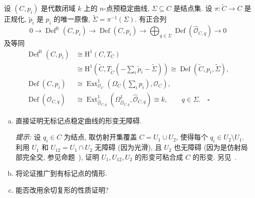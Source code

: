 \begin{proposition}[从局部到整体的形变序列]\label{src:6.3.28}
设 $(C,\allowbreak p_i)$ 是代数闭域 $k$ 上的 $n$-点预稳定曲线, $\Sigma\subseteq C$ 是结点集. 设 $\pi:\widetilde C\to\allowbreak C$ 是正规化, $\widetilde p_i$ 是 $p_i$ 的唯一原像, $\widetilde\Sigma=\pi^{-1}(\Sigma)$. 有正合列
\begin{equation}\label{src:6.3.29}
0\to\operatorname{Def}^{\mathrm{lt}}(C,p_i)\to\operatorname{Def}(C,p_i)\to\bigoplus_{q\in\Sigma}\operatorname{Def}(\widehat{\mathcal O}_{C,q})\to0
\end{equation}
及等同
\[
\begin{aligned}
\operatorname{Def}^{\mathrm{lt}}(C,p_i)&\cong\mathrm H^1(C,T_C)\\
&\cong\mathrm H^1(\widetilde C,T_{\widetilde C}(-\sum_i\widetilde p_i-\widetilde\Sigma))\cong\operatorname{Def}(\widetilde C,p_i,\widetilde\Sigma),\\
\operatorname{Def}(C,p_i)&\cong\operatorname{Ext}^1_{\mathcal O_C}(\Omega_C(\sum_i p_i),\mathcal O_C),\\
\operatorname{Def}(\widehat{\mathcal O}_{C,q})&\cong\operatorname{Ext}^1_{\widehat{\mathcal O}_{C,q}}(\Omega^1_{\widehat{\mathcal O}_{C,q}},\widehat{\mathcal O}_{C,q})\cong k,\qquad q\in\Sigma.\quad\square
\end{aligned}
\]
\end{proposition}
\begin{exercise}[再论稳定曲线的形变]\label{src:6.3.30}
\begin{enumerate}[(a)]
\item 直接证明无标记点稳定曲线的形变无障碍.

\textit{提示:} 设 $q_i\in C$ 为结点, 取仿射开集覆盖 $C=U_1\cup U_2$, 使得每个 $q_i\in U_2\setminus U_1$. 利用 $U_1$ 和 $U_{12}=U_1\cap U_2$ 无障碍 (因为光滑), 且 $U_2$ 也无障碍 (因为是仿射局部完全交, 参见命题~), 证明 $U_1,\allowbreak U_{12},\allowbreak U_2$ 的形变可粘合成 $C$ 的形变. 另见~\cite[Tag 0DZQ]{SP}.
\item 将论证推广到有标记点的情形.
\item 能否改用余切复形的性质证明?
\end{enumerate}
\end{exercise}
